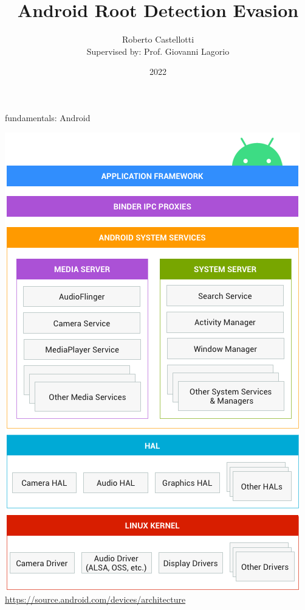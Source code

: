 \documentclass{beamer}
\title{Android Root Detection Evasion}
\author[Roberto Castellotti]{Roberto Castellotti \\ {\small Supervised by: Prof. Giovanni Lagorio}}
\institute{Università di Genova}
\date{2022}
\begin{document}
\frame{\titlepage}

\begin{frame}{fundamentals: Android}

    \centering \includegraphics[scale=0.25]{android.png}
    \href{https://source.android.com/devices/architecture}{https://source.android.com/devices/architecture} 

\end{frame}
\end{document}
